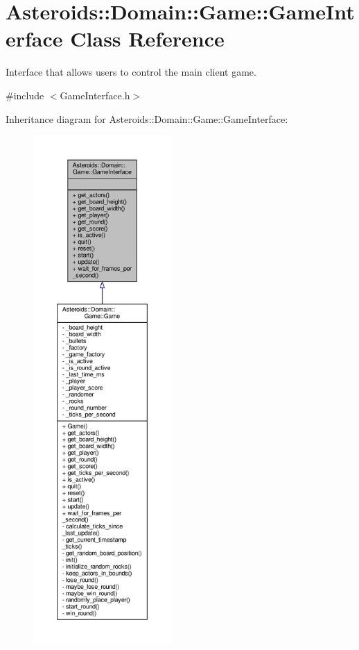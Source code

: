 \hypertarget{classAsteroids_1_1Domain_1_1Game_1_1GameInterface}{}\section{Asteroids\+:\+:Domain\+:\+:Game\+:\+:Game\+Interface Class Reference}
\label{classAsteroids_1_1Domain_1_1Game_1_1GameInterface}


Interface that allows users to control the main client game.  




{\ttfamily \#include $<$Game\+Interface.\+h$>$}



Inheritance diagram for Asteroids\+:\+:Domain\+:\+:Game\+:\+:Game\+Interface\+:\nopagebreak
\begin{figure}[H]
\begin{center}
\leavevmode
\includegraphics[height=550pt]{classAsteroids_1_1Domain_1_1Game_1_1GameInterface__inherit__graph}
\end{center}
\end{figure}



